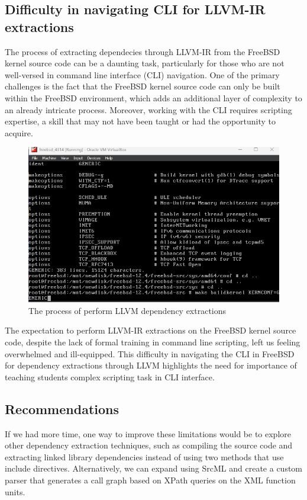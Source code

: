 \documentclass[12pt, dvipsnames, a4paper]{article}
\begin{document}
\subsection{Difficulty in navigating CLI for LLVM-IR extractions}
The process of extracting dependecies through LLVM-IR from the FreeBSD kernel source code can be a daunting task, particularly for those who are not well-versed in command line interface (CLI) navigation. One of the primary challenges is the fact that the FreeBSD kernel source code can only be built within the FreeBSD environment, which adds an additional layer of complexity to an already intricate process. Moreover, working with the CLI requires scripting expertise, a skill that may not have been taught or had the opportunity to acquire. 
\begin{figure}[H]
    \center
    \includegraphics[width = 450pt]{assets/make_kern.png}
    \caption{The process of perform LLVM dependency extractions}
\end{figure}
The expectation to perform LLVM-IR extractions on the FreeBSD kernel source code, despite the lack of formal training in command line scripting, left us feeling overwhelmed and ill-equipped. This difficulty in navigating the CLI in FreeBSD for dependency extractions through LLVM highlights the need for importance of teaching students complex scripting task in CLI interface.

\subsection{Recommendations}
If we had more time, one way to improve these limitations would be to explore other dependency extraction techniques, such as compiling the source code and extracting linked library dependencies instead of using two methods that use include directives. Alternatively, we can expand using SrcML and create a custom parser that generates a call graph based on XPath queries on the XML function units.
\clearpage
\end{document}
